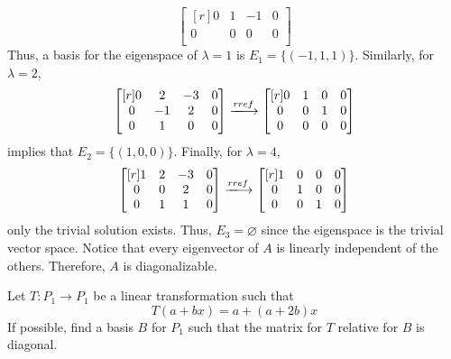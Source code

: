 \documentclass{article}
\theoremstyle{definition}
\newenvironment{solution}[1][]{\begin{replacementsoln}}{\end{replacementsoln}}
\begin{document}
\begin{solution}
\[\begin{bmatrix}[r]
       0&1  &-1  &0   \\
       0&0  &0  &0   \\
    \end{bmatrix}
  \]
  Thus, a basis for the eigenspace of \(\lambda =1\) is \(E_1 = \{ (-1,1,1) \} \). Similarly, for \(\lambda =2\),
  \[
    \begin{bmatrix}[r]
      0 &2  &-3  &0   \\
       0&-1  &2  &0   \\
       0&1  &0  &0   \\
    \end{bmatrix}\xlongrightarrow{rref} \begin{bmatrix}[r]
      0 &1  &0  & 0  \\
       0&0  &1  &0   \\
       0&0  &0  &0   \\
    \end{bmatrix}
  \]
  implies that \(E_2 = \{ (1,0,0) \} \). Finally, for \(\lambda =4\),
  \[
    \begin{bmatrix}[r]
      1 &2  &-3  &0   \\
       0&0  &2  &0   \\
       0&1  &1  &0   \\
    \end{bmatrix}\xlongrightarrow{rref} \begin{bmatrix}[r]
       1&0  &0  &0   \\
       0&1  &0  &0   \\
       0&0  &1  &0   \\
    \end{bmatrix}
  \]
  only the trivial solution exists. Thus, \(E_3 = \varnothing \) since the eigenspace is the trivial vector space. Notice that every eigenvector of \(A\) is linearly independent of the others. Therefore, \(A\) is diagonalizable.
\end{solution}
\begin{exercise}
  Let $T: P_1\rightarrow  P_1$ be a linear transformation such that
  \[T(a+ bx)=a+(a+2b)x\]
	If possible, find a basis $B$ for $P_1$ such that  the matrix for $T$ relative for $B$ is diagonal.
\end{exercise}
\end{document}

